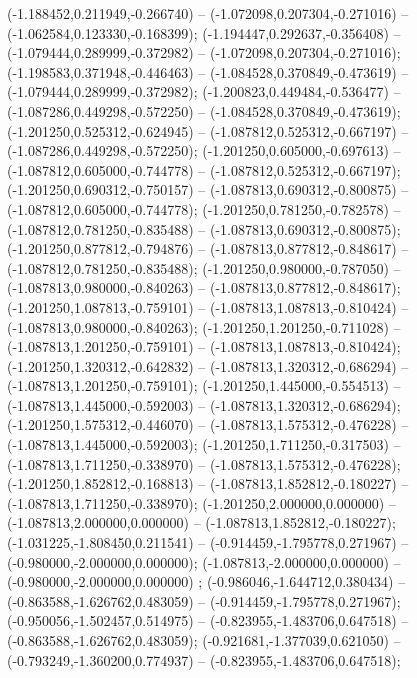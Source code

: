 (-1.188452,0.211949,-0.266740) -- (-1.072098,0.207304,-0.271016) -- (-1.062584,0.123330,-0.168399);
 (-1.194447,0.292637,-0.356408) -- (-1.079444,0.289999,-0.372982) -- (-1.072098,0.207304,-0.271016);
 (-1.198583,0.371948,-0.446463) -- (-1.084528,0.370849,-0.473619) -- (-1.079444,0.289999,-0.372982);
 (-1.200823,0.449484,-0.536477) -- (-1.087286,0.449298,-0.572250) -- (-1.084528,0.370849,-0.473619);
 (-1.201250,0.525312,-0.624945) -- (-1.087812,0.525312,-0.667197) -- (-1.087286,0.449298,-0.572250);
 (-1.201250,0.605000,-0.697613) -- (-1.087812,0.605000,-0.744778) -- (-1.087812,0.525312,-0.667197);
 (-1.201250,0.690312,-0.750157) -- (-1.087813,0.690312,-0.800875) -- (-1.087812,0.605000,-0.744778);
 (-1.201250,0.781250,-0.782578) -- (-1.087812,0.781250,-0.835488) -- (-1.087813,0.690312,-0.800875);
 (-1.201250,0.877812,-0.794876) -- (-1.087813,0.877812,-0.848617) -- (-1.087812,0.781250,-0.835488);
 (-1.201250,0.980000,-0.787050) -- (-1.087813,0.980000,-0.840263) -- (-1.087813,0.877812,-0.848617);
 (-1.201250,1.087813,-0.759101) -- (-1.087813,1.087813,-0.810424) -- (-1.087813,0.980000,-0.840263);
 (-1.201250,1.201250,-0.711028) -- (-1.087813,1.201250,-0.759101) -- (-1.087813,1.087813,-0.810424);
 (-1.201250,1.320312,-0.642832) -- (-1.087813,1.320312,-0.686294) -- (-1.087813,1.201250,-0.759101);
 (-1.201250,1.445000,-0.554513) -- (-1.087813,1.445000,-0.592003) -- (-1.087813,1.320312,-0.686294);
 (-1.201250,1.575312,-0.446070) -- (-1.087813,1.575312,-0.476228) -- (-1.087813,1.445000,-0.592003);
 (-1.201250,1.711250,-0.317503) -- (-1.087813,1.711250,-0.338970) -- (-1.087813,1.575312,-0.476228);
 (-1.201250,1.852812,-0.168813) -- (-1.087813,1.852812,-0.180227) -- (-1.087813,1.711250,-0.338970);
 (-1.201250,2.000000,0.000000) -- (-1.087813,2.000000,0.000000) -- (-1.087813,1.852812,-0.180227);
 (-1.031225,-1.808450,0.211541) -- (-0.914459,-1.795778,0.271967) -- (-0.980000,-2.000000,0.000000);
 (-1.087813,-2.000000,0.000000) -- (-0.980000,-2.000000,0.000000) ;
 (-0.986046,-1.644712,0.380434) -- (-0.863588,-1.626762,0.483059) -- (-0.914459,-1.795778,0.271967);
 (-0.950056,-1.502457,0.514975) -- (-0.823955,-1.483706,0.647518) -- (-0.863588,-1.626762,0.483059);
 (-0.921681,-1.377039,0.621050) -- (-0.793249,-1.360200,0.774937) -- (-0.823955,-1.483706,0.647518);
